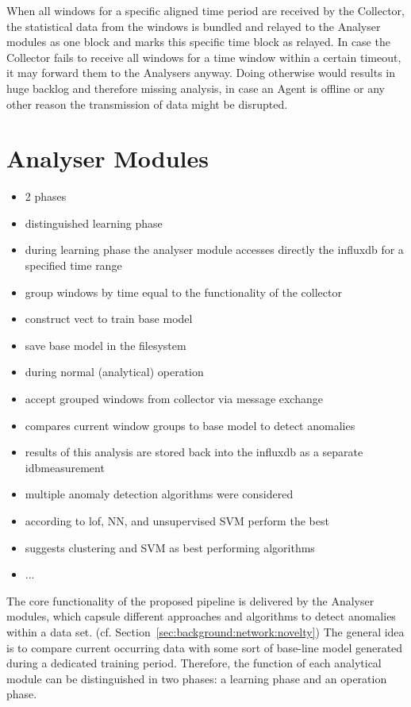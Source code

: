 When all windows for a specific aligned time period are received by the Collector, the statistical data from the windows is bundled and relayed to the Analyser modules as one block and marks this specific time block as relayed.
In case the Collector fails to receive all windows for a time window within a certain timeout, it may forward them to the Analysers anyway.
Doing otherwise would results in huge backlog and therefore missing analysis, in case an Agent is offline or any other reason the transmission of data might be disrupted.

\section{Analyser Modules}
\label{sec:concept:anal}

\begin{itemize}
	\item 2 phases
	\item distinguished learning phase
	\item during learning phase the analyser module accesses directly the \gls{influxdb} for a specified time range
	\item group windows by time equal to the functionality of the collector
	\item construct \gls{vect} to train base model
	\item save base model in the filesystem
	
	\item during normal (analytical) operation
	\item accept grouped windows from collector via message exchange
	\item compares current window groups to base model to detect anomalies
	\item results of this analysis are stored back into the \gls{influxdb} as a separate \gls{idbmeasurement}
	
	\item multiple anomaly detection algorithms were considered
	\item according to \textcite{Lazarevic2003} \gls{lof}, NN, and unsupervised SVM perform the best
	\item \textcite{Eskin2002} suggests clustering and SVM as best performing algorithms
	\item ...
\end{itemize}

The core functionality of the proposed pipeline is delivered by the Analyser modules, which capsule different approaches and algorithms to detect anomalies within a data set. (cf. Section~\ref{sec:background:network:novelty})
The general idea is to compare current occurring data with some sort of base-line model generated during a dedicated training period.
Therefore, the function of each analytical module can be distinguished in two phases: a learning phase and an operation phase.

